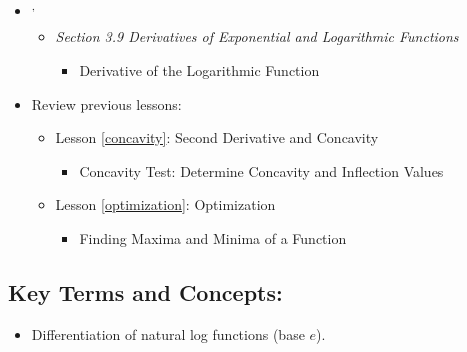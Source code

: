 \begin{framed}
\begin{itemize}
\item \cite{openstax}\footnotemark[2]\textsuperscript{,}\footnotemark[3]
    \begin{itemize}
        \item \emph{Section 3.9 Derivatives of Exponential and Logarithmic Functions}
        \begin{itemize}
            \item Derivative of the Logarithmic Function
        \end{itemize}
    \end{itemize}
\item Review previous lessons:
\begin{itemize}
    \item Lesson \ref{concavity}: Second Derivative and Concavity
    \begin{itemize}
        \item Concavity Test: Determine Concavity and Inflection Values
    \end{itemize}
    \item Lesson \ref{optimization}: Optimization
    \begin{itemize}
        \item Finding Maxima and Minima of a Function
    \end{itemize}
\end{itemize}
\end{itemize}
\subsection*{Key Terms and Concepts:} 

\begin{itemize}
    \item Differentiation of natural log functions (base $e$).
\end{itemize}
\end{framed}


